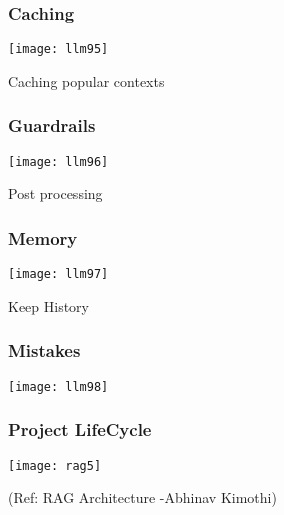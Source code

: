 \begin{frame}[fragile]\frametitle{Caching}


\begin{center}
\texttt{[image: llm95]}

\end{center}

Caching popular contexts
\end{frame}

\begin{frame}[fragile]\frametitle{Guardrails}


\begin{center}
\texttt{[image: llm96]}

\end{center}

Post processing
\end{frame}

\begin{frame}[fragile]\frametitle{Memory}


\begin{center}
\texttt{[image: llm97]}

\end{center}

Keep History
\end{frame}

\begin{frame}[fragile]\frametitle{Mistakes}


\begin{center}
\texttt{[image: llm98]}

\end{center}

\end{frame}

\begin{frame}[fragile]\frametitle{Project LifeCycle}


		\begin{center}
		\texttt{[image: rag5]}
		\end{center}

{\tiny (Ref: RAG Architecture -Abhinav  Kimothi)}

\end{frame}